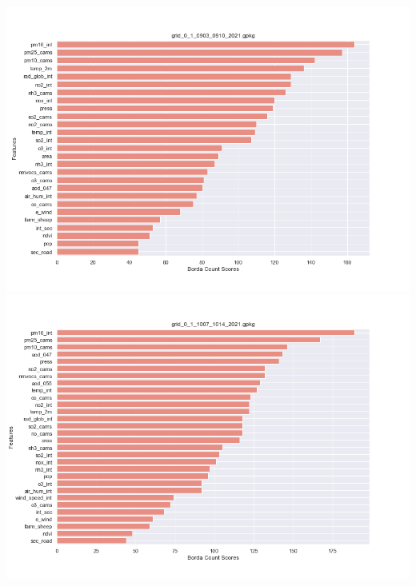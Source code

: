\begin{center}
\includegraphics[width=.9\textwidth]{images/fs_results/pm25/01/montains/grid_0_1_0903_0910_2021.png}
\includegraphics[width=.9\textwidth]{images/fs_results/pm25/01/montains/grid_0_1_1007_1014_2021.png}
\end{center}

